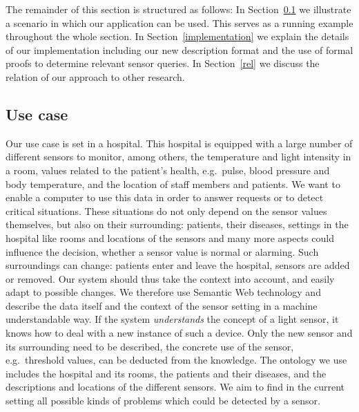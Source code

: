 The remainder of this section is structured as follows: 
In Section~\ref{usecasenew} we illustrate a scenario in which our application can be used. This serves as a running example throughout the whole section. 
In Section~\ref{implementation} we explain the details of our implementation including our new description format and the use of
formal 
proofs to determine relevant sensor queries. 
In Section~\ref{rel} we discuss the relation of our approach to other research.

\subsection{Use case}\label{usecasenew}
Our use case  is set in a hospital.  This hospital is equipped with a large number of different sensors to monitor, among others, 
the temperature and light intensity in a room, 
 values related to the patient's health, 
e.g.\ pulse, blood pressure and body temperature, and the location of staff members and patients. 
We want to enable a computer to use this data in order to answer requests or to detect critical situations.
These situations do not only depend on the sensor values themselves, but also on their surrounding: 
patients, their diseases, settings in the hospital like rooms and locations of the sensors and many more aspects could influence the decision, whether a 
sensor value is normal or alarming.
Such surroundings can change: patients enter and leave the hospital, sensors are added or removed.
Our system should thus take the context into account, and easily adapt to possible changes.
We therefore use Semantic Web technology and 
  describe the data itself and 
the context of the sensor setting in a machine understandable way. If the system \emph{understands} the concept of a light sensor, 
it knows how to deal with a new instance of such a 
device. Only the new sensor and its surrounding need to be described, the concrete use of the sensor, e.g.\ threshold values, can be deducted from the knowledge.
%
The ontology we use includes the hospital and its rooms, 
the patients and their diseases, 
and the descriptions and locations of the different sensors. 
We aim to find in the current setting all possible kinds of problems which could be detected by a sensor. 


